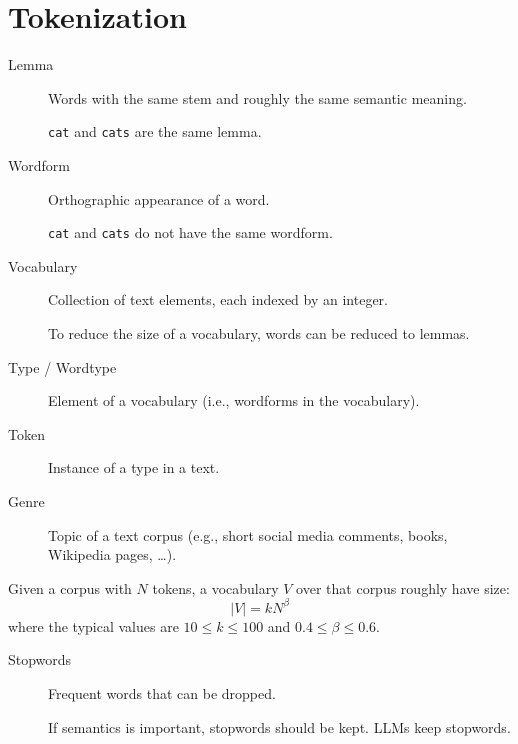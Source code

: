 \section{Tokenization}

\begin{description}
    \item[Lemma] 
        Words with the same stem and roughly the same semantic meaning.
        \begin{example}
            \texttt{cat} and \texttt{cats} are the same lemma.
        \end{example}

    \item[Wordform] 
        Orthographic appearance of a word.
        \begin{example}
            \texttt{cat} and \texttt{cats} do not have the same wordform.
        \end{example}
    
    \item[Vocabulary] 
        Collection of text elements, each indexed by an integer.

        \begin{remark}
            To reduce the size of a vocabulary, words can be reduced to lemmas.
        \end{remark}

    \item[Type / Wordtype] 
        Element of a vocabulary (i.e., wordforms in the vocabulary).
    
    \item[Token] 
        Instance of a type in a text.

    \item[Genre] 
        Topic of a text corpus (e.g., short social media comments, books, Wikipedia pages, \dots).
\end{description}

\begin{remark}
    Given a corpus with $N$ tokens, a vocabulary $V$ over that corpus roughly have size:
    \[ \left\vert V \right\vert = kN^\beta \]
    where the typical values are $10 \leq k \leq 100$ and $0.4 \leq \beta \leq 0.6$.
\end{remark}

\begin{description}
    \item[Stopwords] 
        Frequent words that can be dropped.

        \begin{remark}
            If semantics is important, stopwords should be kept. LLMs keep stopwords.
        \end{remark}
\end{description}

